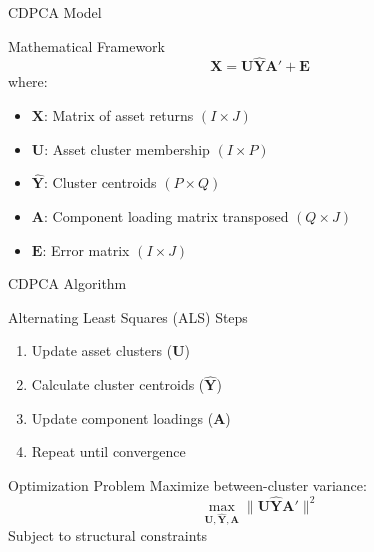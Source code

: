 \documentclass{beamer}
\begin{document}
\begin{frame}{CDPCA Model}
    \begin{block}{Mathematical Framework}
        \begin{equation*}
            \mathbf{X} = \mathbf{U}\hat{\mathbf{Y}}\mathbf{A}' + \mathbf{E}
        \end{equation*}
        where:
        \begin{itemize}
            \item $\mathbf{X}$: Matrix of asset returns $(I \times J)$
            \item $\mathbf{U}$: Asset cluster membership $(I \times P)$
            \item $\hat{\mathbf{Y}}$: Cluster centroids $(P \times Q)$
            \item $\mathbf{A}$: Component loading matrix transposed $(Q \times J)$
            \item $\mathbf{E}$: Error matrix $(I \times J)$
        \end{itemize}
    \end{block}
\end{frame}

\begin{frame}{CDPCA Algorithm}
    \begin{block}{Alternating Least Squares (ALS) Steps}
        \begin{enumerate}
            \item Update asset clusters ($\mathbf{U}$)
            \item Calculate cluster centroids ($\hat{\mathbf{Y}}$)
            \item Update component loadings ($\mathbf{A}$)
            \item Repeat until convergence
        \end{enumerate}
    \end{block}

    \begin{block}{Optimization Problem}
        Maximize between-cluster variance:
        \begin{equation*}
            \max_{\mathbf{U},\hat{\mathbf{Y}},\mathbf{A}} \|\mathbf{U}\hat{\mathbf{Y}}\mathbf{A}'\|^2
        \end{equation*}
        Subject to structural constraints
    \end{block}
\end{frame}
\end{document}
